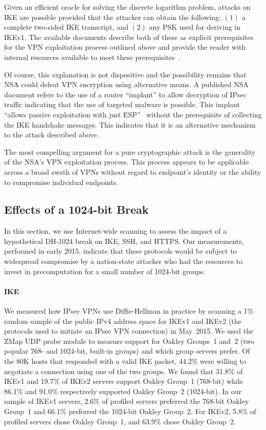 Given an efficient oracle for solving the discrete logarithm problem, attacks
on IKE are possible provided that the attacker can obtain the following:
$(1)$ a complete two-sided IKE transcript, and $(2)$ any PSK used for
deriving {\skeyid} in IKEv1. The available documents describe both of these
as explicit prerequisites for the VPN exploitation process outlined above and
provide the reader with internal resources available to meet these
prerequisites~\cite{media-35515}.

Of course, this explanation is not dispositive and the possibility remains
that NSA could defeat VPN encryption using alternative means. A published NSA
document refers to the use of a router ``implant'' to allow decryption of
IPsec traffic indicating that the use of targeted malware is possible. This
implant ``allows passive exploitation with just ESP''~\cite{media-35515}
without the prerequisite of collecting the IKE handshake messages. This
indicates that it is an alternative mechanism to the attack described above.

The most compelling argument for a pure cryptographic attack is the
generality of the NSA's VPN exploitation process. This process appears to be
applicable across a broad swath of VPNs without regard to endpoint's identity
or the ability to compromise individual endpoints.


\subsection{Effects of a 1024-bit Break}
\label{sec:1024effects}

In this section, we use Internet-wide scanning to assess the impact of a
hypothetical DH-1024 break on IKE, SSH, and HTTPS\@. Our measurements,
performed in early 2015, indicate that these protocols would be subject to
widespread compromise by a nation-state attacker who had the resources to
invest in precomputation for a small number of 1024-bit groups.

\paragraph{IKE}
We measured how IPsec VPNs use Diffie-Hellman in practice by scanning a 1\%
random sample of the public IPv4 address space for IKEv1 and IKEv2 (the
protocols used to initiate an IPsec VPN connection) in May~2015. We used the
ZMap UDP probe module to measure support for Oakley Groups~1 and~2 (two
popular 768- and 1024-bit, built-in groups) and which group servers prefer.
Of the 80K hosts that responded with a valid IKE packet, 44.2\% were willing
to negotiate a connection using one of the two groups. We found that 31.8\%
of IKEv1 and 19.7\% of IKEv2 servers support Oakley Group~1 (768-bit) while
86.1\% and 91.0\% respectively supported Oakley Group~2 (1024-bit). In our
sample of IKEv1 servers, 2.6\% of profiled servers preferred the 768-bit
Oakley Group~1 and 66.1\% preferred the 1024-bit Oakley Group~2. For IKEv2,
5.8\% of profiled servers chose Oakley Group~1, and 63.9\% chose Oakley
Group~2.

